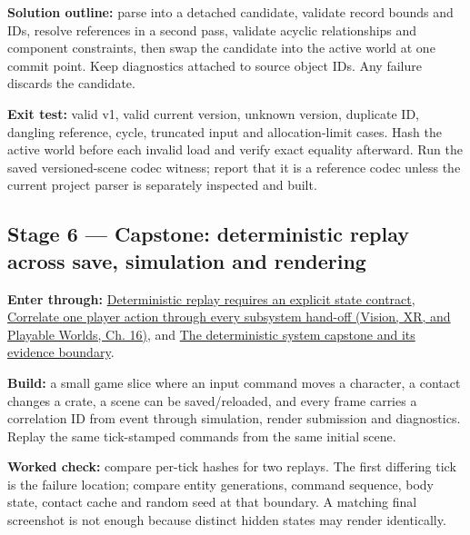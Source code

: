 \textbf{Solution outline:} parse into a detached candidate, validate record bounds and IDs, resolve references in a second pass, validate acyclic relationships and component constraints, then swap the candidate into the active world at one commit point. Keep diagnostics attached to source object IDs. Any failure discards the candidate.

\textbf{Exit test:} valid v1, valid current version, unknown version, duplicate ID, dangling reference, cycle, truncated input and allocation-limit cases. Hash the active world before each invalid load and verify exact equality afterward. Run the saved versioned-scene codec witness; report that it is a reference codec unless the current project parser is separately inspected and built.

\subsection{Stage 6 --- Capstone: deterministic replay across save, simulation and rendering}\label{06-engine-ii-ch042-stage-6-capstone-deterministic-replay-across-save-simulation-and-rendering}

\hypertarget{06-engine-ii-ch042-stage-6-capstone-deterministic-replay-across-save-simulation-and-rendering}{}

\textbf{Enter through:} \hyperref[06-engine-ii-ch042-deterministic-replay-requires-an-explicit-state-contract]{Deterministic replay requires an explicit state contract}, \href{../07-Vision-XR-and-Playable-Worlds/main.pdf\#nameddest=06-engine-ii-ch041-correlate-one-player-action-through-every-subsystem-hand-off}{Correlate one player action through every subsystem hand-off (Vision, XR, and Playable Worlds, Ch. 16)}, and \hyperref[06-engine-ii-ch042-the-deterministic-system-capstone-and-its-evidence-boundary]{The deterministic system capstone and its evidence boundary}.

\textbf{Build:} a small game slice where an input command moves a character, a contact changes a crate, a scene can be saved/reloaded, and every frame carries a correlation ID from event through simulation, render submission and diagnostics. Replay the same tick-stamped commands from the same initial scene.

\textbf{Worked check:} compare per-tick hashes for two replays. The first differing tick is the failure location; compare entity generations, command sequence, body state, contact cache and random seed at that boundary. A matching final screenshot is not enough because distinct hidden states may render identically.

